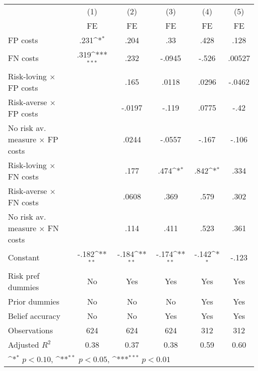 {
\def\sym#1{\ifmmode^{#1}\else\(^{#1}\)\fi}
\begin{tabular}{l*{5}{c}}
\hline\hline
                &\multicolumn{1}{c}{(1)}&\multicolumn{1}{c}{(2)}&\multicolumn{1}{c}{(3)}&\multicolumn{1}{c}{(4)}&\multicolumn{1}{c}{(5)}\\
                &\multicolumn{1}{c}{FE}&\multicolumn{1}{c}{FE}&\multicolumn{1}{c}{FE}&\multicolumn{1}{c}{FE}&\multicolumn{1}{c}{FE}\\
\hline
FP costs        &     .231\sym{*}  &     .204         &      .33         &     .428         &     .128         \\
FN costs        &     .319\sym{***}&     .232         &   -.0945         &    -.526         &   .00527         \\
Risk-loving $\times$ FP costs&                  &     .165         &    .0118         &    .0296         &   -.0462         \\
Risk-averse $\times$ FP costs&                  &   -.0197         &    -.119         &    .0775         &     -.42         \\
No risk av. measure $\times$ FP costs&                  &    .0244         &   -.0557         &    -.167         &    -.106         \\
Risk-loving $\times$ FN costs&                  &     .177         &     .474\sym{*}  &     .842\sym{*}  &     .334         \\
Risk-averse $\times$ FN costs&                  &    .0608         &     .369         &     .579         &     .302         \\
No risk av. measure $\times$ FN costs&                  &     .114         &     .411         &     .523         &     .361         \\
Constant        &    -.182\sym{**} &    -.184\sym{**} &    -.174\sym{**} &    -.142\sym{*}  &    -.123         \\
Risk pref dummies &       No         &      Yes         &      Yes         &      Yes         &      Yes         \\
Prior dummies   &       No         &       No         &       No         &      Yes         &      Yes         \\
Belief accuracy &       No         &       No         &      Yes         &      Yes         &      Yes         \\
\hline
Observations    &      624         &      624         &      624         &      312         &      312         \\
Adjusted \(R^{2}\)&     0.38         &     0.37         &     0.38         &     0.59         &     0.60         \\
\hline\hline
\multicolumn{6}{l}{\footnotesize \sym{*} \(p<0.10\), \sym{**} \(p<0.05\), \sym{***} \(p<0.01\)}\\
\end{tabular}
}
